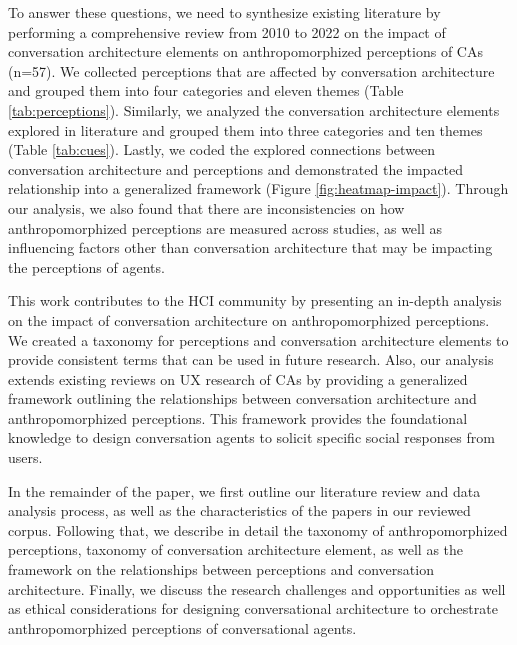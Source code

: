 \documentclass[sigconf,screen,review, anonymous]{acmart}
\begin{document}
To answer these questions, we need to synthesize existing literature by performing a comprehensive review from 2010 to 2022 on the impact of conversation architecture elements on anthropomorphized perceptions of CAs (n=57). We collected perceptions that are affected by conversation architecture and grouped them into four categories and eleven themes (Table \ref{tab:perceptions}). Similarly, we analyzed the conversation architecture elements explored in literature and grouped them into three categories and ten themes (Table \ref{tab:cues}). Lastly, we coded the explored connections between conversation architecture and perceptions and demonstrated the impacted relationship into a generalized framework (Figure \ref{fig:heatmap-impact}). Through our analysis, we also found that there are inconsistencies on how anthropomorphized perceptions are measured across studies, as well as influencing factors other than conversation architecture that may be impacting the perceptions of agents.

This work contributes to the HCI community by presenting an in-depth analysis on the impact of conversation architecture on anthropomorphized perceptions. We created a taxonomy for perceptions and conversation architecture elements to provide consistent terms that can be used in future research. Also, our analysis extends existing reviews on UX research of CAs \cite{clark2019state}\cite{rapp2021human}\cite{zheng2022ux} by providing a generalized framework outlining the relationships between conversation architecture and anthropomorphized perceptions. This framework provides the foundational knowledge to design conversation agents to solicit specific social responses from users.

In the remainder of the paper, we first outline our literature review and data analysis process, as well as the characteristics of the papers in our reviewed corpus. Following that, we describe in detail the taxonomy of anthropomorphized perceptions, taxonomy of conversation architecture element, as well as the framework on the relationships between perceptions and conversation architecture. Finally, we discuss the research challenges and opportunities as well as ethical considerations for designing conversational architecture to orchestrate anthropomorphized perceptions of conversational agents.


\end{document}
